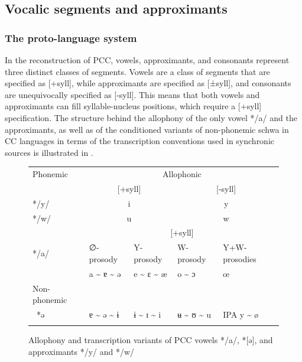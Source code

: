 \documentclass[output=paper]{langscibook}
\begin{document}
\subsection{Vocalic segments and approximants}
\label{sec:Wolff:2.3}
\subsubsection{The proto-language system}
\label{sec:Wolff:2.3.1}
In the reconstruction of PCC, vowels, approximants, and consonants represent three distinct classes of segments. Vowels are a class of segments that are specified as [+syll], while approximants are specified as [±syll], and consonants are unequivocally specified as [-syll]. This means that both vowels and approximants can fill syllable-nucleus positions, which require a [+syll] specification. The structure behind the allophony of the only vowel */a/ and the approximants, as well as of the conditioned variants of non-phonemic schwa in CC languages in terms of the transcription conventions used in synchronic sources is illustrated in .

\begin{figure}
\caption{Allophony and transcription variants of PCC vowels */a/, *[ə], and approximants */y/ and */w/}
\label{figtab:wolff:9}
\begin{tabularx}{\textwidth}{Xllll}
\lsptoprule
 Phonemic & \multicolumn{4}{c}{ Allophonic}\\
& \multicolumn{2}{c}{ [+syll]} & \multicolumn{2}{c}{ [-syll]}\\
\cmidrule(r){2-3}\cmidrule(l){4-5}
 */y/ & \multicolumn{2}{c}{ i} & \multicolumn{2}{c}{ y}\\
 \tablevspace
 */w/ & \multicolumn{2}{c}{ u} & \multicolumn{2}{c}{ w}\\
 \tablevspace
& \multicolumn{4}{c}{ [+syll]}\\
\cmidrule{2-5}
 */a/ & ∅-prosody & Y-prosody & W-prosody & Y+W-prosodies\\
& a {\textasciitilde} ɐ {\textasciitilde} ə & e {\textasciitilde} ɛ {\textasciitilde} æ & o {\textasciitilde} ɔ & œ\\
\tablevspace
Non-phonemic\\\
*ə & ɐ {\textasciitilde} ə {\textasciitilde} ɨ & ɨ {\textasciitilde} ɪ {\textasciitilde} i & ʉ {\textasciitilde} ʊ {\textasciitilde} u & IPA y {\textasciitilde} ø\\
\lspbottomrule
\end{tabularx}
\end{figure}
\end{document}
